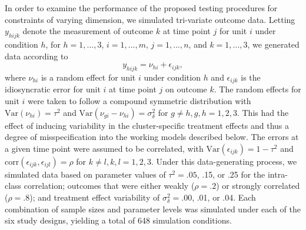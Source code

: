 \documentclass[12pt]{article}\usepackage[]{graphicx}\usepackage[]{color}
\newcommand{\Var}{\text{Var}}
\begin{document}
In order to examine the performance of the proposed testing procedures for constraints of varying dimension, we simulated tri-variate outcome data. 
Letting $y_{hijk}$ denote the measurement of outcome $k$ at time point $j$ for unit $i$ under condition $h$, for $h = 1,...,3$, $i = 1,...,m$, $j = 1,...,n$, and $k = 1,...,3$, we generated data according to 
\begin{equation}
\label{eq:data_generating_model}
y_{hijk} = \nu_{hi} + \epsilon_{ijk},
\end{equation}
where $\nu_{hi}$ is a random effect for unit $i$ under condition $h$ and $\epsilon_{ijk}$ is the idiosyncratic error for unit $i$ at time point $j$ on outcome $k$. 
The random effects for unit $i$ were taken to follow a compound symmetric distribution with $\Var\left(\nu_{hi}\right) = \tau^2$ and $\text{Var}\left(\nu_{gi} - \nu_{hi}\right) = \sigma_\delta^2$ for $g \neq h, g,h = 1,2,3$. 
This had the effect of inducing variability in the cluster-specific treatment effects and thus a degree of misspecification into the working models described below. 
The errors at a given time point were assumed to be correlated, with $\Var\left(\epsilon_{ijk}\right) = 1 - \tau^2$ and $\text{corr}\left(\epsilon_{ijk}, \epsilon_{ijl}\right) = \rho$ for $k\neq l, k,l = 1,2,3$. 
Under this data-generating process, we simulated data based on parameter values of $\tau^2 = .05$, .15, or .25 for the intra-class correlation; outcomes that were either weakly ($\rho = .2$) or strongly correlated ($\rho = .8$); and treatment effect variability of $\sigma_\delta^2 = .00$, .01, or .04.
Each combination of sample sizes and parameter levels was simulated under each of the six study designs, yielding a total of 648 simulation conditions.
\end{document}
